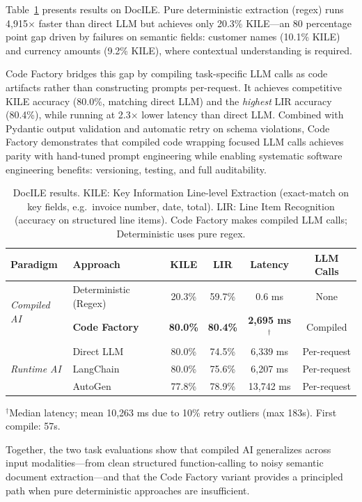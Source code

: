 \documentclass[11pt]{article}
\begin{document}
Table~\ref{tab:docile-main} presents results on DocILE. Pure deterministic extraction (regex) runs 4,915$\times$ faster than direct LLM but achieves only 20.3\% KILE---an 80 percentage point gap driven by failures on semantic fields: customer names (10.1\% KILE) and currency amounts (9.2\% KILE), where contextual understanding is required.

Code Factory bridges this gap by compiling task-specific LLM calls as code artifacts rather than constructing prompts per-request. It achieves competitive KILE accuracy (80.0\%, matching direct LLM) and the \emph{highest} LIR accuracy (80.4\%), while running at 2.3$\times$ lower latency than direct LLM. Combined with Pydantic output validation and automatic retry on schema violations, Code Factory demonstrates that compiled code wrapping focused LLM calls achieves parity with hand-tuned prompt engineering while enabling systematic software engineering benefits: versioning, testing, and full auditability.

\begin{table}[ht]
\centering
\caption{DocILE results. KILE: Key Information Line-level Extraction (exact-match on key fields, e.g.\ invoice number, date, total). LIR: Line Item Recognition (accuracy on structured line items). Code Factory makes compiled LLM calls; Deterministic uses pure regex.}
\label{tab:docile-main}
\begin{tabular}{llcccc}
\toprule
\textbf{Paradigm} & \textbf{Approach} & \textbf{KILE} & \textbf{LIR} & \textbf{Latency} & \textbf{LLM Calls} \\
\midrule
\multirow{2}{*}{\textit{Compiled AI}}
  & Deterministic (Regex) & 20.3\% & 59.7\% & 0.6 ms & None \\
  & \textbf{Code Factory} & \textbf{80.0\%} & \textbf{80.4\%} & \textbf{2,695 ms}$^\dagger$ & Compiled \\
\midrule
\multirow{3}{*}{\textit{Runtime AI}}
  & Direct LLM & 80.0\% & 74.5\% & 6,339 ms & Per-request \\
  & LangChain  & 80.0\% & 75.6\% & 6,207 ms & Per-request \\
  & AutoGen    & 77.8\% & 78.9\% & 13,742 ms & Per-request \\
\bottomrule
\end{tabular}
\vspace{0.5em}
\small{$^\dagger$Median latency; mean 10,263 ms due to 10\% retry outliers (max 183s). First compile: 57s.}
\end{table}

Together, the two task evaluations show that compiled AI generalizes across input modalities---from clean structured function-calling to noisy semantic document extraction---and that the Code Factory variant provides a principled path when pure deterministic approaches are insufficient.
\end{document}
